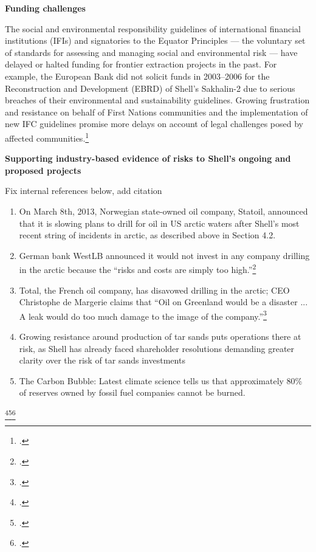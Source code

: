 \textbf{Funding challenges}



The social and environmental responsibility guidelines of international financial institutions (IFIs) and signatories to the Equator Principles --- the voluntary set of standards for assessing and managing social and environmental risk --- have delayed or halted funding for frontier extraction projects in the past. 
For example, the European Bank did not solicit funds in 2003--2006 for the Reconstruction and Development (EBRD) of Shell's Sakhalin-2 due to serious breaches of their environmental and sustainability guidelines. 
Growing frustration and resistance on behalf of First Nations communities and the implementation of new IFC guidelines promise more delays on account of legal challenges posed by affected communities.\footcite[][]{Mathiason_2005}



\textbf{Supporting industry-based evidence of risks to Shell's ongoing and proposed projects}

\begin{vcom}
	Fix internal references below, add citation
\end{vcom}

\begin{enumerate}
	\item On March 8th, 2013, Norwegian state-owned oil company, Statoil, announced that it is slowing plans to drill for oil in US arctic waters after Shell's most recent string of incidents in arctic, as described above in Section 4.2.
	\item German bank WestLB announced it would not invest in any company drilling in the arctic because the ``risks and costs are simply too high.''\footcite[][]{Naidoo_2012}
	\item Total, the French oil company, has disavowed drilling in the arctic; CEO Christophe de Margerie claims that ``Oil on Greenland would be a disaster ... A leak would do too much damage to the image of the company.''\footcite[][]{NewsWire_2012}
	\item Growing resistance around production of tar sands puts operations there at risk, as Shell has already faced shareholder resolutions demanding greater clarity over the risk of tar sands investments
	\item The Carbon Bubble: Latest climate science tells us that approximately 80\% of reserves owned by fossil fuel companies cannot be burned.
\end{enumerate}\footcite[][]{carbontracker}\footcite[][]{UNEP_2009}\footcite[][]{HSBC_2013}


